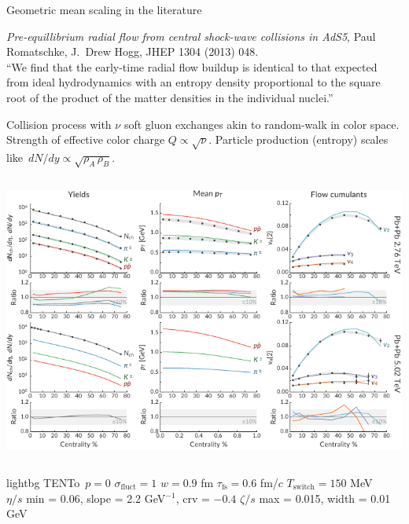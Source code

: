 \documentclass{beamer}
\newcommand{\trento}{T\raisebox{-0.3ex}{R}ENTo}
\newcommand{\fullwidth}[1]{
  \begin{columns}
    \column{\paperwidth}
    #1
  \end{columns}
}
\begin{document}
\begin{frame}{Geometric mean scaling in the literature}
  \begin{tcolorbox}[title=AdS-CFT holography, colframe=theme!60!white, colback=theme!02]
  {\small \textcolor{theme}{\emph{Pre-equillibrium radial flow from central shock-wave collisions in AdS5}, Paul Romatschke, J.\ Drew Hogg, JHEP 1304 (2013) 048.}\\[1ex]
    ``We find that the early-time radial flow buildup is identical to that expected from ideal hydrodynamics with an entropy density proportional to the square root of the product of the matter densities in the individual nuclei.''}
  \end{tcolorbox}
  \smallskip
  \begin{tcolorbox}[title=Color flux-tube model, colframe=theme!60!white, colback=theme!02]
    {\small Collision process with $\nu$ soft gluon exchanges akin to random-walk in color space. Strength of effective color charge $Q \propto \sqrt{\nu}$. Particle production (entropy) scales like\, $dN/dy \propto \sqrt{\rho_A\, \rho_B}$}.
  \end{tcolorbox}
\end{frame}


\begin{frame}[plain,t]
  \fullwidth{
    \centering
    \includegraphics{observables_map}
  }
  \bigskip
  \scriptsize
  \begin{beamercolorbox}[sep=1ex]{lightbg}
    \trento\ $p = 0$
    \hfill
    $\sigma_\text{fluct} = 1$
    \hfill
    $w = 0.9$ fm
    \hfill
    $\tau_\text{fs} = 0.6$ fm/$c$
    \hfill
    $T_\text{switch} = 150$ MeV
    \\[1ex]
    $\eta/s$ min = 0.06, \enskip slope = 2.2 GeV$^{-1}$, \enskip crv = $-0.4$
    \hfill
  $\zeta/s$ max = 0.015, \enskip width = 0.01 GeV
  \end{beamercolorbox}
\end{frame}
\end{document}
